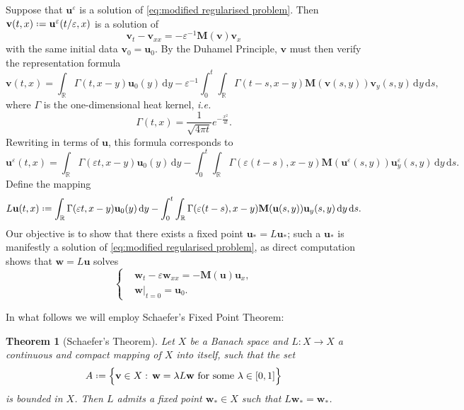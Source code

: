 \documentclass[11pt,a4paper,reqno]{amsart}
\numberwithin{equation}{section}
\newtheorem{theorem}{Theorem}[section]
\theoremstyle{definition}
\theoremstyle{remark}
\newcommand{\bu}{\mathbf{u}}
\newcommand{\bv}{\mathbf{v}}
\newcommand{\bw}{\mathbf{w}}
\renewcommand{\d}{\, \mathrm{d}}
\newcommand{\bM}{\mathbf{M}}
\newcommand*{\defeq}{\mathrel{\vcenter{\baselineskip0.5ex \lineskiplimit0pt
                     \hbox{\scriptsize.}\hbox{\scriptsize.}}}%
                     =}
\begin{document}
{Suppose that $\bu^\varepsilon$ is a solution of \eqref{eq:modified regularised problem}. Then $\bv(t,x) \defeq \bu^\varepsilon(t/\varepsilon,x)$ is a solution of 
\begin{equation*}
    \bv_t - \bv_{xx} = -\varepsilon^{-1}\bM(\bv)\bv_x 
\end{equation*}
with the same initial data $\bv_0 = \bu_0$. By the Duhamel Principle, $\bv$ must then verify the representation formula 
\begin{equation*}
    \bv(t,x) = \int_\mathbb{R} \Gamma(t,x-y) \bu_0(y) \d y - \varepsilon^{-1}\int_0^t \int_\mathbb{R} \Gamma(t-s,x-y) \bM(\bv(s,y)) \bv_y(s,y) \d y \d s, 
\end{equation*}
where $\Gamma$ is the one-dimensional heat kernel, \textit{i.e.} 
\begin{equation*}
    \Gamma(t,x) = \frac{1}{\sqrt{4\pi t}}e^{-\frac{x^2}{4t}}. 
\end{equation*}
Rewriting in terms of $\bu$, this formula corresponds to 
\begin{equation*}
    \bu^\varepsilon(t,x) = \int_\mathbb{R} \Gamma(\varepsilon t,x-y) \bu_0(y) \d y - \int_0^{t} \int_\mathbb{R} \Gamma(\varepsilon (t - s),x-y) \bM(\bu^\varepsilon(s,y))\bu^\varepsilon_y(s,y) \d y \d s. 
\end{equation*}
%
Define the mapping 
\begin{equation}\label{eq:L def}
    L\bu(t,x) \defeq \int_\mathbb{R} \Gamma(\varepsilon t,x-y) \bu_0(y) \d y - \int_0^{t} \int_\mathbb{R} \Gamma(\varepsilon(t-s),x-y) \bM(\bu(s,y)) \bu_y(s,y) \d y \d s. 
\end{equation}
Our objective is to show that there exists a fixed point $\bu_* = L\bu_*$; such a $\bu_*$ is manifestly a solution of \eqref{eq:modified regularised problem}, as direct computation shows that $\bw = L\bu$ solves 
\begin{equation*}
    \left\lbrace\begin{aligned}
    &\bw_t - \varepsilon\bw_{xx} = - \bM(\bu)\bu_x, \\ 
    &\bw|_{t=0} = \bu_0. 
    \end{aligned}\right. 
\end{equation*}


\smallskip 


In what follows we will employ Schaefer's Fixed Point Theorem: 
\begin{theorem}[Schaefer's Theorem]\label{thm:schaefer}
    Let $X$ be a Banach space and $L:X \to X$ a continuous and compact mapping of $X$ into itself, such that the set 
    \begin{equation*}
      A  \defeq   \Big\{ \bv \in X : \, \bw = \lambda L\bw \text{ for some } \lambda \in [0,1] \Big\} 
    \end{equation*}
    is bounded in $X$. Then $L$ admits a fixed point $\bw_* \in X$ such that $L\bw_* = \bw_*$. 
\end{theorem}


}
\end{document}
